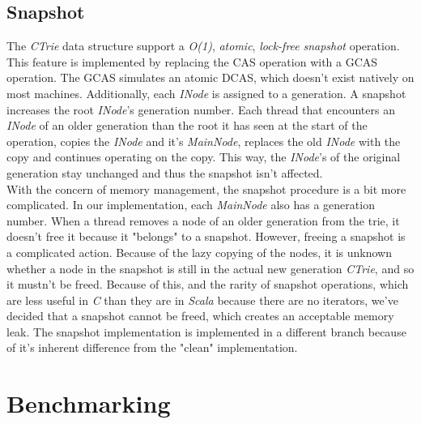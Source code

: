 \documentclass[conference]{IEEEtran}
\begin{document}
\subsection{Snapshot}
	The \textit{CTrie} data structure support a \textit{O(1)}, \textit{atomic}, \textit{lock-free} \textit{snapshot} operation. This feature is implemented by replacing the CAS operation with a GCAS operation. The GCAS simulates an atomic DCAS, which doesn't exist natively on most machines. Additionally, each \textit{INode} is assigned to a generation. A snapshot increases the root \textit{INode}'s generation number. Each thread that encounters an \textit{INode} of an older generation than the root it has seen at the start of the operation, copies the \textit{INode} and it's \textit{MainNode}, replaces the old \textit{INode} with the copy and continues operating on the copy. This way, the \textit{INode}'s of the original generation stay unchanged and thus the snapshot isn't affected. \\
	With the concern of memory management, the snapshot procedure is a bit more complicated. In our implementation, each \textit{MainNode} also has a generation number. When a thread removes a node of an older generation from the trie, it doesn't free it because it "belongs" to a snapshot. However, freeing a snapshot is a complicated action. Because of the lazy copying of the nodes, it is unknown whether a node in the snapshot is still in the actual new generation \textit{CTrie}, and so it mustn't be freed. Because of this, and the rarity of snapshot operations, which are less useful in \textit{C} than they are in \textit{Scala} because there are no iterators, we've decided that a snapshot cannot be freed, which creates an acceptable memory leak.
	The snapshot implementation\cite{snapshot-cictrie} is implemented in a different branch because of it's inherent difference from the "clean" implementation.

\section{Benchmarking}
\end{document}
